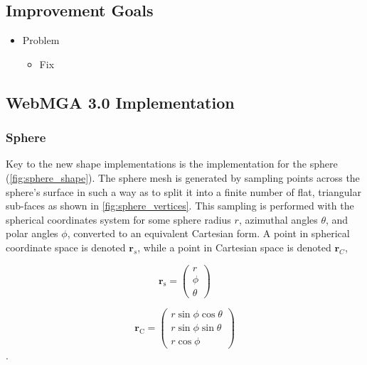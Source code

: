 \subsection{Improvement Goals}
\begin{itemize}
  \item Problem
    \begin{itemize}
      \item Fix
    \end{itemize}
\end{itemize}

\subsection{WebMGA 3.0 Implementation}
\subsubsection{Sphere}
Key to the new shape implementations is the implementation for the sphere (\cref{fig:sphere_shape}). The sphere mesh is generated by sampling points across the sphere's surface in such a way as to split it into a finite number of flat, triangular sub-faces as shown in \cref{fig:sphere_vertices}. This sampling is performed with the spherical coordinates system for some sphere radius $r$, azimuthal angles $\theta$, and polar angles $\phi$, converted to an equivalent Cartesian form. A point in spherical coordinate space is denoted $\mathbf{r}_{s}$, while a point in Cartesian space is denoted $\mathbf{r}_{C}$,

\begin{equation}
\mathbf{r}_\mathrm{s}=\begin{pmatrix}r\\\phi\\\theta\end{pmatrix}
\label{sphere_equation_spherical}
\end{equation}

\begin{equation}
\mathbf{r}_\mathrm{C}=\begin{pmatrix}r\sin\phi \cos\theta\\
r\sin\phi \sin\theta\\
r\cos\phi\end{pmatrix}
\label{sphere_equation_cartesian}
\end{equation}.

